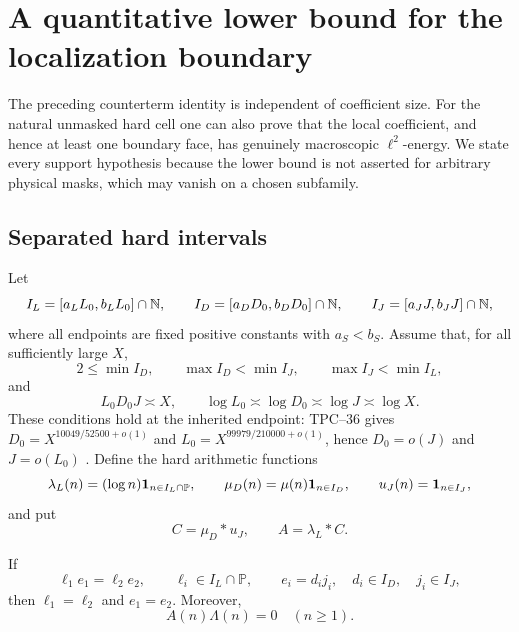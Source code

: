 \section{A quantitative lower bound for the localization boundary}
\label{sec:tpc42-quantitative-boundary}

The preceding counterterm identity is independent of coefficient size.
For the natural unmasked hard cell one can also prove that the local
coefficient, and hence at least one boundary face, has genuinely
macroscopic \(\ell^2\)-energy.  We state every support hypothesis because
the lower bound is not asserted for arbitrary physical masks, which may
vanish on a chosen subfamily.

\subsection{Separated hard intervals}

Let
\begin{equation}
 I_L=[a_LL_0,b_LL_0]\cap\mathbb N,
 \qquad
 I_D=[a_DD_0,b_DD_0]\cap\mathbb N,
 \qquad
 I_J=[a_JJ,b_JJ]\cap\mathbb N,
 \label{eq:tpc42-boundary-intervals}
\end{equation}
where all endpoints are fixed positive constants with
\(a_S<b_S\).  Assume that, for all sufficiently large \(X\),
\begin{equation}
 2\le\min I_D,
 \qquad
 \max I_D<\min I_J,
 \qquad
 \max I_J<\min I_L,
 \label{eq:tpc42-boundary-scale-separation}
\end{equation}
and
\begin{equation}
 L_0D_0J\asymp X,
 \qquad
 \log L_0\asymp\log D_0\asymp\log J\asymp\log X.
 \label{eq:tpc42-boundary-polynomial-scales}
\end{equation}
These conditions hold at the inherited endpoint: TPC--36 gives
\(D_0=X^{10049/52500+o(1)}\) and
\(L_0=X^{99979/210000+o(1)}\), hence
\(D_0=o(J)\) and \(J=o(L_0)\) \citep{WangTPC36}.  Define the hard
arithmetic functions
\begin{equation}
 \lambda_L(n)=(\log n)\mathbf 1_{n\in I_L\cap\mathbb P},
 \qquad
 \mu_D(n)=\mu(n)\mathbf 1_{n\in I_D},
 \qquad
 u_J(n)=\mathbf 1_{n\in I_J},
 \label{eq:tpc42-boundary-hard-functions}
\end{equation}
and put
\begin{equation}
 C=\mu_D*u_J,
 \qquad
 A=\lambda_L*C.
 \label{eq:tpc42-boundary-C-A}
\end{equation}

\begin{lemma}
\label{lem:tpc42-boundary-outer-uniqueness}
If
\begin{equation}
 \ell_1e_1=\ell_2e_2,
 \qquad
 \ell_i\in I_L\cap\mathbb P,
 \qquad
 e_i=d_ij_i,
 \quad d_i\in I_D,
 \quad j_i\in I_J,
 \label{eq:tpc42-boundary-two-representations}
\end{equation}
then \(\ell_1=\ell_2\) and \(e_1=e_2\).  Moreover,
\begin{equation}
 \boxed{A(n)\Lambda(n)=0\quad(n\ge1).}
 \label{eq:tpc42-boundary-Lambda-orthogonality}
\end{equation}
\end{lemma}


